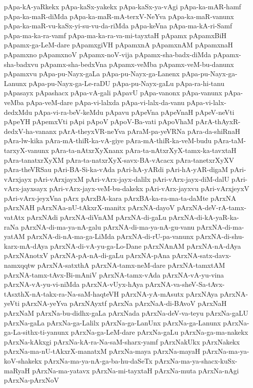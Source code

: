 {pApa-kA-yaRkekx
pApa-kaSx-yakekx
pApa-kaSx-ya-vAgi
pApa-ka-mAR-hamf
pApa-ka-maR-diMda
pApa-ka-maR-mA-terxV-NeYva
pApa-ka-maR-vanunx
pApa-ka-maR-vu-kaSx-yi-su-vu-da-riMda
pApa-keVna
pApa-ma-kA-ri-Samf
pApa-ma-ka-ra-vamf
pApa-ma-ka-ra-va-mi-tayxtaH
pApamx
pApamxBiH
pApamx-ga-LeM-dare
pApamxgiVH
pApamxnA
pApamxnAM
pApamxnaH
pApamxno
pApamxnoV
pApamx-noV-vija
pApamx-sha-badx-diMda
pApamx-sha-badxvu
pApamx-sha-bedxVna
pApamx-veMba
pApamx-veM-bu-danunx
pApamxvu
pApa-pu-Nayx-gaLa
pApa-pu-Nayx-ga-Lanenx
pApa-pu-Nayx-ga-Lanunx
pApa-pu-Nayx-ga-Le-raDU
pApa-pu-Nayx-gaLu
pApa-ra-hi-tanu
pApasayx
pApashacx
pApa-vA-gali
pApavU
pApa-vanonx
pApa-vanunx
pApa-veMba
pApa-veM-dare
pApa-vi-lalxda
pApa-vi-lalx-da-vanu
pApa-vi-lalx-dedxMdu
pApa-vi-ra-beV-keMdu
pApavu
pApeVna
pApeVnaH
pApeV-neVti
pApeYH
pApemxVti
pApi
pApoV
pApoV-Ba-vati
pApoVhaM
pArA-thAyxR-dedxV-ha-vananx
pArA-theyxVR-neYva
pAraM-pa-yeVRNa
pAra-da-shiRnaH
pAra-lw-kika
pAra-mA-thiR-ka-vA-giye
pAra-mA-thiR-ka-veM-budu
pAra-taM-tarxyX-vanunx
pAra-ta-nAtxrXyXnanx
pAra-ta-nAtxrXyX-tamx-ka-tavxtaH
pAra-tanatxrXyXM
pAra-ta-natxrXyX-savx-BA-vAcacx
pAra-tanetxrXyXV
pAra-theVRSau
pAri-BA-Si-ka-vAda
pAri-hA-yARdi
pAri-hA-yAR-digaM
pAri-vArxjayx
pAri-vArxjayxM
pAri-vArx-jayx-dalilx
pAri-vArx-jayx-diM-dalU
pAri-vArx-jayxsayx
pAri-vArx-jayx-veM-bu-dakekx
pAri-vArx-jayxvu
pAri-vArxjeyxV
pAri-vArx-jeyxVna
pArx
pArxBA-kara
pArxBA-ka-ra-ma-ta-daMte
pArxNA
pArxNAH
pArxNAa-nU-tAkxrX-manitx
pArxNA-dayoV
pArxNA-deV-rA-tamx-vatAtx
pArxNAdi
pArxNA-diVnAM
pArxNA-di-gaLu
pArxNA-di-kA-yaR-ka-raNa
pArxNA-di-ma-ya-nA-galu
pArxNA-di-ma-ya-nA-gu-vanu
pArxNA-di-ma-yatAM
pArxNA-di-nA-ma-ga-LiMda
pArxNA-di-rU-pa-vanunx
pArxNA-di-shu-karx-mA-dAya
pArxNA-di-vA-yu-ga-Lo-Dane
pArxNAnAM
pArxNA-nA-dAya
pArxNAnotxV
pArxNA-pA-nA-di-gaLu
pArxNA-pAna
pArxNA-satx-davx-namxqqtw
pArxNA-satxthA
pArxNA-tamx-neM-dare
pArxNA-tamxtAM
pArxNA-tamx-tAvx-Bi-mAniV
pArxNA-tamx-vAda
pArxNA-vA-yu-vina
pArxNA-vA-yu-vi-niMda
pArxNA-vUyx-hAya
pArxNA-va-sheV-Sa-tAvx-tAsxthX-nA-takx-ra-Na-saM-haqteVH
pArxNA-yA-mAsutx
pArxNAya
pArxNA-yeVti
pArxNA-yeYva
pArxNAyxtf
pArxNa
pArxNaA-di-BAvoV
pArxNaH
pArxNaM
pArxNa-bu-didhx-gaLa
pArxNada
pArxNa-deV-va-teyu
pArxNa-gaLU
pArxNa-gaLa
pArxNa-ga-Lalilx
pArxNa-ga-LanUnx
pArxNa-ga-Lanunx
pArxNa-ga-La-sithx-ti-yanunx
pArxNa-ga-LeM-dare
pArxNa-gaLu
pArxNa-ga-ma-nakekx
pArxNa-kAkxgi
pArxNa-kA-ra-Na-saM-sharx-yamf
pArxNakUkx
pArxNakekx
pArxNa-ma-nU-tAkxrX-manatxM
pArxNa-maya
pArxNa-mayaH
pArxNa-ma-ya-koV-shakekx
pArxNa-ma-ya-nA-ga-ba-hu-daSeTx
pArxNa-ma-ya-shacx-kuSx-maRyaH
pArxNa-ma-yatavx
pArxNa-mi-tayxtaH
pArxNa-muta
pArxNa-nAgi
pArxNa-pArxNoV
}
